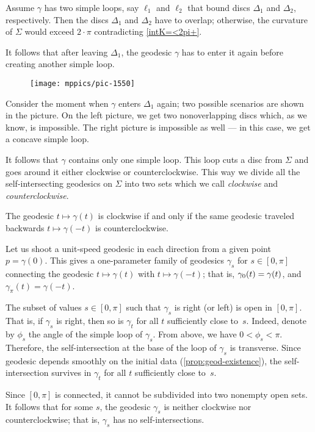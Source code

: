 Assume $\gamma$ has two simple loops, say $\ell_1$ and $\ell_2$ that bound discs $\Delta_1$ and $\Delta_2$, respectively.
Then the discs $\Delta_1$ and $\Delta_2$ have to overlap;
otherwise, the curvature of $\Sigma$ would exceed $2\cdot\pi$  contradicting \ref{intK=<2pi+}.

It follows that after leaving $\Delta_1$, the geodesic $\gamma$ has to enter it again before creating another simple loop.
\begin{figure}[h!]
\vskip-0mm
\centering
\texttt{[image: mppics/pic-1550]}
\end{figure}
Consider the moment when $\gamma$ enters $\Delta_1$ again;
two possible scenarios are shown in the picture.
On the left picture, we get two nonoverlapping discs which, as we know, is impossible.
The right picture is impossible as well --- in this case, we get a concave simple loop.

It follows that $\gamma$ contains only one simple loop.
This loop cuts a disc from $\Sigma$ 
and goes around it either clockwise or counterclockwise.
This way we divide all the self-intersecting geodesics on $\Sigma$
into two sets which we call {}\emph{clockwise} and {}\emph{counterclockwise}.

The geodesic $t\mapsto \gamma(t)$ is clockwise 
if and only if the same geodesic traveled backwards
$t\mapsto \gamma(-t)$
is counterclockwise.

Let us shoot a unit-speed geodesic in each direction from a given point $p=\gamma(0)$.
This gives a one-parameter family of geodesics $\gamma_s$ for $s\in[0,\pi]$ connecting the geodesic $t\mapsto \gamma(t)$ with $t\mapsto \gamma(-t)$; that is, $\gamma_0(t)\z=\gamma(t)$, and $\gamma_\pi(t)=\gamma(-t)$.

The subset of values $s\in [0,\pi]$ such that $\gamma_s$ is right (or left) is open in $[0,\pi]$.
That is, if $\gamma_s$ is right, then so is $\gamma_t$ for all $t$ sufficiently close to~$s$.
Indeed, denote by $\phi_s$ the angle of the simple loop of $\gamma_s$.
From above, we have $0<\phi_s<\pi$.
Therefore, the self-intersection at the base of the loop of $\gamma_s$ is transverse.
Since geodesic depends smoothly on the initial data 
(\ref{prop:geod-existence}), the self-intersection survives in $\gamma_t$ for all $t$ sufficiently close to~$s$.

Since $[0,\pi]$ is connected, it cannot be subdivided into two nonempty open sets.
It follows that for some $s$, the geodesic $\gamma_s$ is neither  clockwise nor counterclockwise;
that is, $\gamma_s$ has no self-intersections.
\qeds

